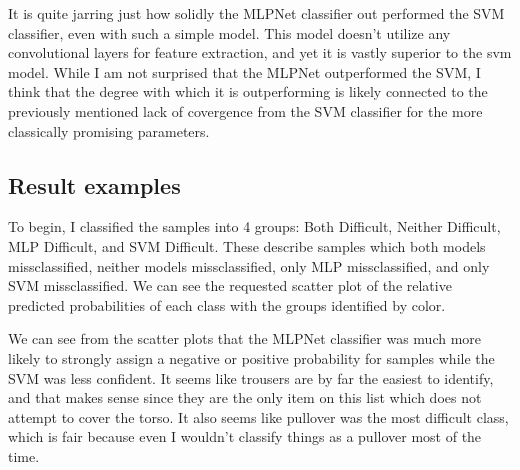 \documentclass[12pt]{article}
\begin{document}
It is quite jarring just how solidly the MLPNet classifier out performed the SVM classifier, even with such a simple model. 
This model doesn't utilize any convolutional layers for feature extraction, and yet it is vastly superior to the svm model.
While I am not surprised that the MLPNet outperformed the SVM, I think that the degree with which it is outperforming is likely 
connected to the previously mentioned lack of covergence from the SVM classifier for the more classically promising parameters.

\subsection{Result examples}
To begin, I classified the samples into 4 groups: Both Difficult, Neither Difficult, MLP Difficult, and SVM Difficult. These 
describe samples which both models missclassified, neither models missclassified, only MLP missclassified, and only SVM missclassified.
We can see the requested scatter plot of the relative predicted probabilities of each class with the groups identified by color.

We can see from the scatter plots that the MLPNet classifier was much more likely to strongly assign a negative or positive 
probability for samples while the SVM was less confident. It seems like trousers are by far the easiest to identify, and that 
makes sense since they are the only item on this list which does not attempt to cover the torso. It also seems like pullover 
was the most difficult class, which is fair because even I wouldn't classify things as a pullover most of the time.
\end{document}
